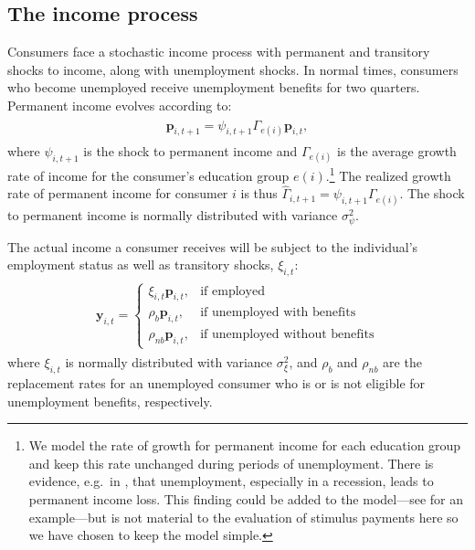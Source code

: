 \documentclass[\econtexRoot/HAFiscal]{subfiles}
\begin{document}
\hypertarget{the-income-process}{}\par\subsection{The income process}

Consumers face a stochastic income process with permanent and transitory shocks to income, along with unemployment shocks.
In normal times, consumers who become unemployed receive unemployment benefits for two quarters.
Permanent income evolves according to:
\begin{equation}\begin{gathered}\begin{aligned}
  \mathbf{p}_{i,t+1} = \psi_{i,t+1}\Gamma_{e(i)}\mathbf{p}_{i,t},
\end{aligned}\end{gathered}\end{equation}
where $\psi_{i,t+1}$ is the shock to permanent income and $\Gamma_{e(i)}$ is the average growth rate of income for the consumer's education group $e(i)$.\footnote{We model the rate of growth for permanent income for each education group and keep this rate unchanged during periods of unemployment.
There is evidence, e.g.\ in \cite{davis_recessions_2011}, that unemployment, especially in a recession, leads to permanent income loss.
This finding could be added to the model---see \citet{carroll2020modeling} for an example---but is not material to the evaluation of stimulus payments here so we have chosen to keep the model simple.
} The realized growth rate of permanent income for consumer $i$ is thus $\hat{\Gamma}_{i,t+1} = \psi_{i,t+1} \Gamma_{e(i)}$.
The shock to permanent income is normally distributed with variance $\sigma_{\psi}^2$.

The actual income a consumer receives will be subject to the individual's employment status as well as transitory shocks, $\xi_{i,t}$:
\begin{equation}\begin{gathered}\begin{aligned}
  \mathbf{y}_{i,t} =   \begin{cases}
    \xi_{i,t}\mathbf{p}_{i,t}, & \text{if employed} \\
    \rho_b \mathbf{p}_{i,t}, & \text{if unemployed with benefits} \\
    \rho_{nb} \mathbf{p}_{i,t}, & \text{if unemployed without benefits} 
  \end{cases}
\end{aligned}\end{gathered}\end{equation}
where $\xi_{i,t}$ is normally distributed with variance $\sigma_{\xi}^2$, and $\rho_b$ and $\rho_{nb}$ are the replacement rates for an unemployed consumer who is or is not eligible for unemployment benefits, respectively.
\end{document}
